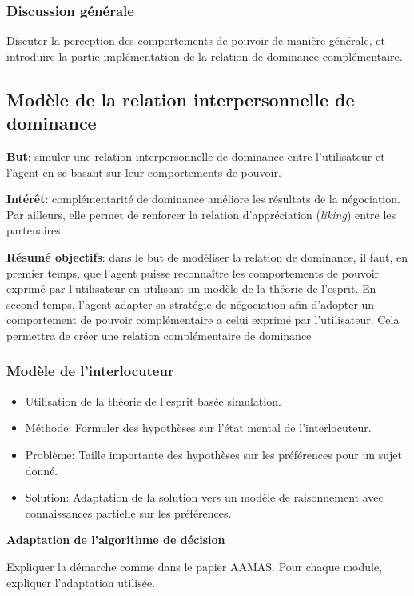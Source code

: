 \subsubsection{Discussion générale}
Discuter la perception des comportements de pouvoir de manière générale, et introduire la partie implémentation de la relation de dominance complémentaire.
\subsection{Modèle de la relation interpersonnelle de dominance}
\textbf{But}: simuler une relation interpersonnelle de dominance entre l'utilisateur et l'agent en se basant sur leur comportements de pouvoir. 

\textbf{Intérêt}: complémentarité de dominance améliore les résultats de la négociation. Par ailleurs, elle permet de renforcer la relation d'appréciation (\emph{liking}) entre les partenaires.  

\textbf{Résumé objectifs}: dans le but de modéliser la relation de dominance, il faut, en premier temps, que l'agent puisse reconnaître les comportements de pouvoir exprimé par l'utilisateur en utilisant un modèle de la théorie de l'esprit. En second temps, l'agent adapter sa stratégie de négociation afin d'adopter un comportement de pouvoir complémentaire a celui exprimé par l'utilisateur. Cela permettra de créer une relation complémentaire de dominance 

\subsubsection{Modèle de l'interlocuteur}
\begin{itemize}
	\item Utilisation de la théorie de l'esprit basée simulation. 
	\item Méthode: Formuler des hypothèses sur l'état mental de l'interlocuteur.
	\item Problème: Taille importante des hypothèses sur les préférences pour un sujet donné. 
	\item Solution: Adaptation de la solution vers un modèle de raisonnement avec connaissances partielle sur les préférences. 
\end{itemize}

\textbf{Adaptation de l'algorithme de décision}

\par Expliquer la démarche comme dans le papier AAMAS. Pour chaque module, expliquer l'adaptation utilisée.

